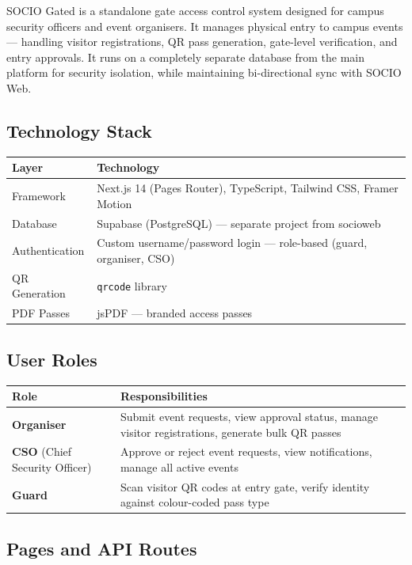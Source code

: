 \documentclass[12pt,a4paper]{article}
\begin{document}
SOCIO Gated is a standalone gate access control system designed for campus security officers and event organisers. It manages physical entry to campus events — handling visitor registrations, QR pass generation, gate-level verification, and entry approvals. It runs on a completely separate database from the main platform for security isolation, while maintaining bi-directional sync with SOCIO Web.

\subsection{Technology Stack}

\begin{tabularx}{\textwidth}{L{3.5cm} X}
\toprule
{}
\textbf{Layer} & \textbf{Technology} \\
\midrule
Framework & Next.js 14 (Pages Router), TypeScript, Tailwind CSS, Framer Motion \\
Database & Supabase (PostgreSQL) — separate project from socioweb \\
Authentication & Custom username/password login — role-based (guard, organiser, CSO) \\
QR Generation & \texttt{qrcode} library \\
PDF Passes & jsPDF — branded access passes \\
\bottomrule
\end{tabularx}

\subsection{User Roles}

\begin{tabularx}{\textwidth}{L{3cm} X}
\toprule
{}
\textbf{Role} & \textbf{Responsibilities} \\
\midrule
\textbf{Organiser} & Submit event requests, view approval status, manage visitor registrations, generate bulk QR passes \\
\textbf{CSO} (Chief Security Officer) & Approve or reject event requests, view notifications, manage all active events \\
\textbf{Guard} & Scan visitor QR codes at entry gate, verify identity against colour-coded pass type \\
\bottomrule
\end{tabularx}

\subsection{Pages and API Routes}
\end{document}
